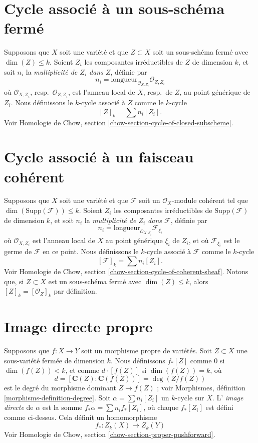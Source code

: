 \section{Cycle associé à un sous-schéma fermé}
\label{section-cycle-of-closed}

\noindent
Supposons que $X$ soit une variété et que $Z \subset X$ soit un sous-schéma fermé
avec $\dim(Z) \leq k$. Soient $Z_i$ les composantes irréductibles de $Z$ de
dimension $k$, et soit $n_i$ la {\it multiplicité de $Z_i$ dans $Z$},
définie par
$$
n_i = \text{longueur}_{\mathcal{O}_{X, Z_i}} \mathcal{O}_{Z, Z_i}
$$
où $\mathcal{O}_{X, Z_i}$, resp.\ $\mathcal{O}_{Z, Z_i}$, est l'anneau
local de $X$, resp.\ de $Z$, au point générique de $Z_i$.
Nous définissons le $k$-cycle associé à $Z$ comme le $k$-cycle
$$
[Z]_k = \sum n_i [Z_i].
$$
Voir Homologie de Chow, section \ref{chow-section-cycle-of-closed-subscheme}.


\section{Cycle associé à un faisceau cohérent}
\label{section-cycle-of-coherent-sheaf}

\noindent
Supposons que $X$ soit une variété et que
$\mathcal{F}$ soit un $\mathcal{O}_X$-module cohérent tel que
$\dim(\text{Supp}(\mathcal{F})) \leq k$.
Soient $Z_i$ les composantes irréductibles de $\text{Supp}(\mathcal{F})$
de dimension $k$, et soit $n_i$ la
{\it multiplicité de $Z_i$ dans $\mathcal{F}$}, définie par
$$
n_i = \text{longueur}_{\mathcal{O}_{X, Z_i}} \mathcal{F}_{\xi_i}
$$
où $\mathcal{O}_{X, Z_i}$ est l'anneau
local de $X$ au point générique $\xi_i$ de $Z_i$,
et où $\mathcal{F}_{\xi_i}$ est le germe de $\mathcal{F}$ en ce point.
Nous définissons le $k$-cycle associé à $\mathcal{F}$ comme le $k$-cycle
$$
[\mathcal{F}]_k = \sum n_i [Z_i].
$$
Voir Homologie de Chow, section \ref{chow-section-cycle-of-coherent-sheaf}.
Notons que, si $Z \subset X$ est un sous-schéma fermé avec $\dim(Z) \leq k$, alors
$[Z]_k = [\mathcal{O}_Z]_k$ par définition.


\section{Image directe propre}
\label{section-pushforward}

\noindent
Supposons que $f : X \to Y$ soit un morphisme propre de variétés.
Soit $Z \subset X$ une sous-variété fermée de dimension $k$.
Nous définissons $f_*[Z]$ comme $0$ si $\dim(f(Z)) < k$,
et comme $d \cdot [f(Z)]$ si $\dim(f(Z)) = k$, où
$$
d = [\mathbf{C}(Z) : \mathbf{C}(f(Z))] = \deg(Z/f(Z))
$$
est le degré du morphisme dominant $Z \to f(Z)$ ; voir
Morphismes, définition \ref{morphisms-definition-degree}.
Soit $\alpha = \sum n_i [Z_i]$ un $k$-cycle sur $X$. L'
{\it image directe} de $\alpha$ est la somme $f_* \alpha = \sum n_i f_*[Z_i]$,
où chaque $f_*[Z_i]$ est défini comme ci-dessus. Cela définit un homomorphisme
$$
f_* : Z_k(X) \longrightarrow Z_k(Y)
$$
Voir Homologie de Chow, section \ref{chow-section-proper-pushforward}.

